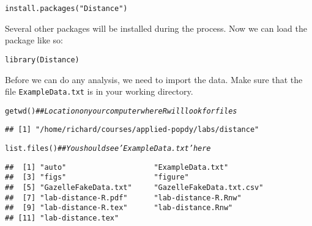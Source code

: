 \documentclass[12pt]{article}\usepackage[]{graphicx}\usepackage[]{color}
\makeatletter
\newcommand{\hlstr}[1]{\textcolor[rgb]{0.749,0.012,0.012}{#1}}%
\newcommand{\hlcom}[1]{\textcolor[rgb]{0.514,0.506,0.514}{\textit{#1}}}%
\newcommand{\hlstd}[1]{\textcolor[rgb]{0,0,0}{#1}}%
\newcommand{\hlkwd}[1]{\textcolor[rgb]{0.004,0.004,0.506}{#1}}%
\newenvironment{kframe}{%
 \def\at@end@of@kframe{}%
 \ifinner\ifhmode%
  \def\at@end@of@kframe{\end{minipage}}%
  \begin{minipage}{\columnwidth}%
 \fi\fi%
 \def\FrameCommand##1{\hskip\@totalleftmargin \hskip-\fboxsep
 \colorbox{shadecolor}{##1}\hskip-\fboxsep
     \hskip-\linewidth \hskip-\@totalleftmargin \hskip\columnwidth}%
 \MakeFramed {\advance\hsize-\width
   \@totalleftmargin\z@ \linewidth\hsize
   \@setminipage}}%
 {\par\unskip\endMakeFramed%
 \at@end@of@kframe}
\newenvironment{knitrout}{}{} %
\makeatother
\begin{document}
\begin{knitrout}
\color{fgcolor}\begin{kframe}
\begin{alltt}
\hlkwd{install.packages}\hlstd{(}\hlstr{"Distance"}\hlstd{)}
\end{alltt}
\end{kframe}
\end{knitrout}

Several other packages will be installed during the process. Now we
can load the package like so: 

\begin{knitrout}
\color{fgcolor}\begin{kframe}
\begin{alltt}
\hlkwd{library}\hlstd{(Distance)}
\end{alltt}
\end{kframe}
\end{knitrout}

Before we can do any analysis, we need to import the 
data. Make sure that the file \texttt{ExampleData.txt} is in your
working directory.

\begin{knitrout}
\color{fgcolor}\begin{kframe}
\begin{alltt}
\hlkwd{getwd}\hlstd{()}       \hlcom{## Location on your computer where R will look for files}
\end{alltt}
\begin{verbatim}
## [1] "/home/richard/courses/applied-popdy/labs/distance"
\end{verbatim}
\begin{alltt}
\hlkwd{list.files}\hlstd{()}  \hlcom{## You should see 'ExampleData.txt' here}
\end{alltt}
\begin{verbatim}
##  [1] "auto"                    "ExampleData.txt"        
##  [3] "figs"                    "figure"                 
##  [5] "GazelleFakeData.txt"     "GazelleFakeData.txt.csv"
##  [7] "lab-distance-R.pdf"      "lab-distance-R.Rnw"     
##  [9] "lab-distance-R.tex"      "lab-distance.Rnw"       
## [11] "lab-distance.tex"
\end{verbatim}
\end{kframe}
\end{knitrout}
\end{document}
